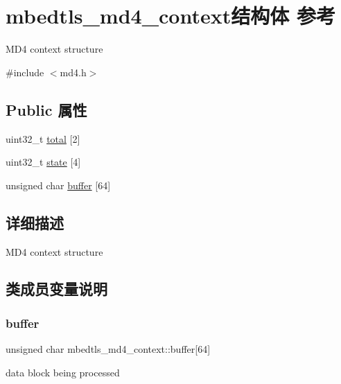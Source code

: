 \hypertarget{structmbedtls__md4__context}{}\section{mbedtls\+\_\+md4\+\_\+context结构体 参考}
\label{structmbedtls__md4__context}


M\+D4 context structure  




{\ttfamily \#include $<$md4.\+h$>$}

\subsection*{Public 属性}
\begin{DoxyCompactItemize}
\item 
uint32\+\_\+t \hyperlink{structmbedtls__md4__context_afabfb5a783d0033a857a375199bf38cc}{total} \mbox{[}2\mbox{]}
\item 
uint32\+\_\+t \hyperlink{structmbedtls__md4__context_afe9a40acdd5470eebce1b98f9379322e}{state} \mbox{[}4\mbox{]}
\item 
unsigned char \hyperlink{structmbedtls__md4__context_aa345ea12be5988ac3bba40ff49bc7277}{buffer} \mbox{[}64\mbox{]}
\end{DoxyCompactItemize}


\subsection{详细描述}
M\+D4 context structure 

\subsection{类成员变量说明}
\mbox{\label{structmbedtls__md4__context_aa345ea12be5988ac3bba40ff49bc7277}} 
\subsubsection{\texorpdfstring{buffer}{buffer}}
{\footnotesize\ttfamily unsigned char mbedtls\+\_\+md4\+\_\+context\+::buffer\mbox{[}64\mbox{]}}

data block being processed \mbox{\label{structmbedtls__md4__context_afe9a40acdd5470eebce1b98f9379322e}} 
